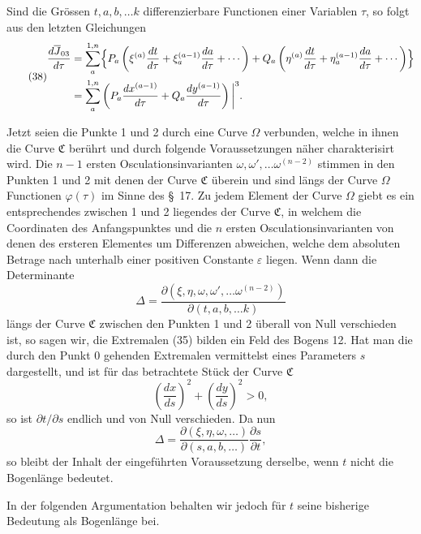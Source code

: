 \documentclass[11pt,a4paper,leqno]{article}
\begin{document}
Sind die Grössen $t,a,b,\ldots k$ differenzierbare Functionen einer Variablen $\tau$, so folgt aus den letzten Gleichungen
\begin{equation}\tag{38}
\begin{aligned}
\frac{d\overline{J}_{03}}{d\tau}
&=\sum_a^{1,n}\Bigl\{
P_a\left(\xi^{(a)}\frac{dt}{d\tau}+\xi_a^{(a-1)}\frac{da}{d\tau}+\cdots\right)
+Q_a\left(\eta^{(a)}\frac{dt}{d\tau}+\eta_a^{(a-1)}\frac{da}{d\tau}+\cdots\right)
\Bigr\}\\
&=\sum_a^{1,n}\left(P_a\frac{dx^{(a-1)}}{d\tau}
+Q_a\frac{dy^{(a-1)}}{d\tau}\right)\bigg|^3 .
\end{aligned}
\end{equation}

Jetzt seien die Punkte 1 und 2 durch eine Curve $\Omega$ verbunden, welche in ihnen die Curve $\mathfrak{C}$ berührt und durch folgende Voraussetzungen näher charakterisirt wird. Die $n-1$ ersten Osculationsinvarianten $\omega,\omega',\ldots\omega^{(n-2)}$ stimmen in den Punkten 1 und 2 mit denen der Curve $\mathfrak{C}$ überein und sind längs der Curve $\Omega$ Functionen $\varphi(\tau)$ im Sinne des \S~17. Zu jedem Element der Curve $\Omega$ giebt es ein entsprechendes zwischen 1 und 2 liegendes der Curve $\mathfrak{C}$, in welchem die Coordinaten des Anfangspunktes und die $n$ ersten Osculationsinvarianten von denen des ersteren Elementes um Differenzen abweichen, welche dem absoluten Betrage nach unterhalb einer positiven Constante $\varepsilon$ liegen. Wenn dann die Determinante
\[
\Delta=\frac{\partial(\xi,\eta,\omega,\omega',\ldots\omega^{(n-2)})}
{\partial(t,a,b,\ldots k)}
\]
längs der Curve $\mathfrak{C}$ zwischen den Punkten 1 und 2 überall von Null verschieden ist, so sagen wir, die Extremalen (35) bilden
ein Feld des Bogens 12. Hat man die durch den Punkt 0 gehenden Extremalen vermittelst eines Parameters $s$ dargestellt, und ist für das betrachtete Stück der Curve $\mathfrak{C}$
\[
\left(\frac{dx}{ds}\right)^2+\left(\frac{dy}{ds}\right)^2>0,
\]
so ist $\partial t/\partial s$ endlich und von Null verschieden. Da nun
\[
\Delta=\frac{\partial(\xi,\eta,\omega,\ldots)}{\partial(s,a,b,\ldots)}
\frac{\partial s}{\partial t},
\]
so bleibt der Inhalt der eingeführten Voraussetzung derselbe, wenn $t$ nicht die Bogenlänge bedeutet.

In der folgenden Argumentation behalten wir jedoch für $t$ seine bisherige Bedeutung als Bogenlänge bei.
\end{document}
